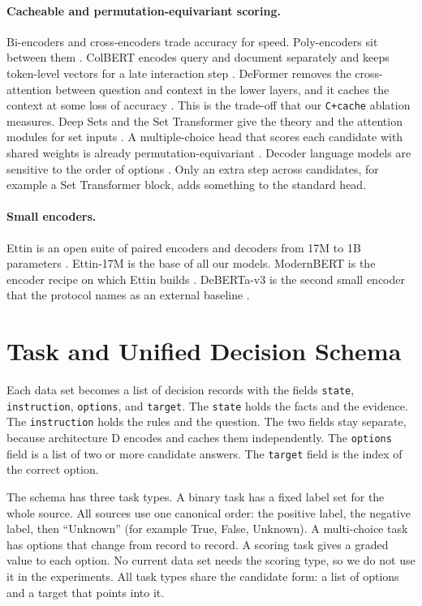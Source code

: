 \documentclass[11pt,a4paper]{article}
\newcommand{\M}[1]{\texttt{#1}}
\begin{document}
\paragraph{Cacheable and permutation-equivariant scoring.}
Bi-encoders and cross-encoders trade accuracy for speed.
Poly-encoders sit between them \cite{humeau2020}.
ColBERT encodes query and document separately and keeps token-level vectors for a late interaction step \cite{khattab2020}.
DeFormer removes the cross-attention between question and context in the lower layers, and it caches the context at some loss of accuracy \cite{cao2020}.
This is the trade-off that our \M{C+cache} ablation measures.
Deep Sets and the Set Transformer give the theory and the attention modules for set inputs \cite{zaheer2017,lee2019}.
A multiple-choice head that scores each candidate with shared weights is already permutation-equivariant \cite{zellers2018}.
Decoder language models are sensitive to the order of options \cite{zheng2024}.
Only an extra step across candidates, for example a Set Transformer block, adds something to the standard head.

\paragraph{Small encoders.}
Ettin is an open suite of paired encoders and decoders from 17M to 1B parameters \cite{weller2026}.
Ettin-17M is the base of all our models.
ModernBERT is the encoder recipe on which Ettin builds \cite{warner2025}.
DeBERTa-v3 is the second small encoder that the protocol names as an external baseline \cite{he2023}.

\section{Task and Unified Decision Schema}\label{sec:task}

Each data set becomes a list of decision records with the fields \texttt{state}, \texttt{instruction}, \texttt{options}, and \texttt{target}.
The \texttt{state} holds the facts and the evidence.
The \texttt{instruction} holds the rules and the question.
The two fields stay separate, because architecture D encodes and caches them independently.
The \texttt{options} field is a list of two or more candidate answers.
The \texttt{target} field is the index of the correct option.

The schema has three task types.
A binary task has a fixed label set for the whole source.
All sources use one canonical order: the positive label, the negative label, then ``Unknown'' (for example True, False, Unknown).
A multi-choice task has options that change from record to record.
A scoring task gives a graded value to each option.
No current data set needs the scoring type, so we do not use it in the experiments.
All task types share the candidate form: a list of options and a target that points into it.
\end{document}
